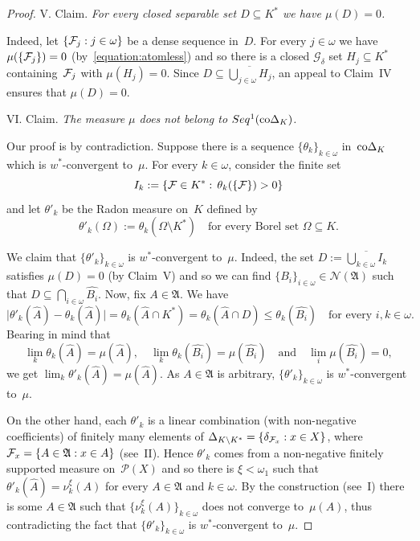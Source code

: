 \documentclass[12pt]{amsart}
\newcommand{\FF}{\protect{\mathcal F}}
\newcommand{\sm}{\setminus}
\newcommand{\sub}{\subseteq}
\newcommand{\alg}{\mathfrak A}
\newcommand{\NN}{{\mathcal N}}
\newcommand{\0}{\protect{\bf 0}}
\newcommand{\1}{\protect{\bf 1}}
\theoremstyle{definition}
\theoremstyle{remark}
\numberwithin{equation}{section}
\begin{document}
\begin{proof}
\smallskip
{\sc V. Claim.} {\em For every closed separable set $D\sub K^*$ we have $\mu(D)=0$.}

Indeed, let $\{\FF_j:j\in \omega\}$ be a dense sequence in~$D$. For every $j\in \omega$ we have
$\mu(\{\FF_j\})=0$ (by~\eqref{equation:atomless}) and so there is a closed $\mathcal{G}_\delta$
set $H_j \sub K^*$ containing~$\FF_j$ with $\mu(H_j)=0$. Since $D \sub \overline{\bigcup_{j\in \omega} H_j}$, an appeal
to Claim~IV ensures that $\mu(D)=0$.

\smallskip
{\sc VI. Claim.} {\em The measure $\mu$ does not belong to $Seq^1({\rm co}\Delta_K)$.}

Our proof is by contradiction. Suppose there is  
a sequence $\{\theta_k\}_{k\in \omega}$ in~${\rm co}\Delta_K$ which is $w^*$-convergent to~$\mu$. 
For every $k\in \omega$, consider the finite set 
$$
	I_k:=\{\FF\in K^*: \, \theta_k(\{\FF\})>0\}
$$
and let $\theta'_k$ be the Radon measure on~$K$ defined by 
$$
	\theta'_k(\Omega):=\theta_k(\Omega \sm K^*)
	\quad
	\mbox{for every Borel set }\Omega \sub K.
$$

We claim that $\{\theta'_k\}_{k\in \omega}$ is $w^*$-convergent to~$\mu$. Indeed, the set
$D:=\overline{\bigcup_{k\in\omega} I_k}$ satisfies $\mu(D)=0$ (by Claim~V) and so 
we can find $\{B_i\}_{i\in \omega}\in \NN(\alg)$ such that $D \sub \bigcap_{i\in \omega}\widehat{B_i}$.
Now, fix $A\in \alg$. We have
$$
	\big|\theta'_k(\widehat{A})-\theta_k(\widehat{A})\big|=
	\theta_k(\widehat{A} \cap K^*)=
	\theta_k(\widehat{A} \cap D) \leq
	\theta_k(\widehat{B_{i}})
	\quad\mbox{for every }i,k\in \omega.
$$
Bearing in mind that 
$$
	\lim_k \theta_k(\widehat{A})=\mu(\widehat{A}),
	\quad 
	\lim_k \theta_k(\widehat{B_i})=\mu(\widehat{B_i}) 
	\quad\mbox{and}
	\quad
	\lim_i \mu(\widehat{B_i})=0,
$$
we get $\lim_k \theta'_k(\widehat{A})= \mu(\widehat{A})$. As $A\in \alg$ is arbitrary,
$\{\theta'_k\}_{k\in \omega}$ is $w^*$-convergent to~$\mu$.

On the other hand, each $\theta'_k$ is a linear combination (with non-negative coefficients)
of finitely many elements of $\Delta_{K\sm K^*}=\{\delta_{\FF_x}:x\in X\}$, 
where $\FF_x=\{A\in \alg:x\in A\}$ (see~II). Hence $\theta'_k$ comes from a
non-negative finitely supported measure on~$\mathcal{P}(X)$ and so
there is $\xi < \omega_1$ such that $\theta'_k(\widehat{A})=\nu^\xi_k(A)$
for every $A\in \alg$ and $k\in \omega$. By the construction (see~I) there is some $A\in \alg$ such that
$\{\nu^\xi_k(A)\}_{k\in \omega}$ does not converge to~$\mu(A)$, thus contradicting
the fact that $\{\theta'_k\}_{k\in \omega}$ is $w^*$-convergent to~$\mu$. 


\end{proof}
\end{document}
